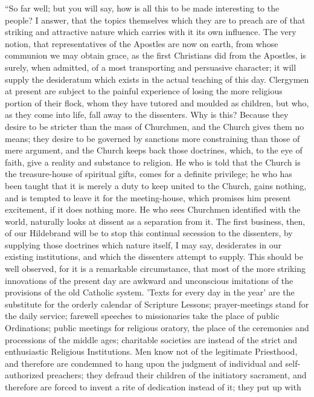 ``So far well; but you will say, how is all this
to be made interesting to the people? I answer, that the topics
themselves which they are to preach are of that striking and
attractive nature which carries with it its own influence. The very
notion, that representatives of the Apostles are now on earth, from
whose communion we may obtain grace, as the first Christians did from
the Apostles, is surely, when admitted, of a most transporting and
persuasive character; it will supply the desideratum which exists in
the actual teaching of this day. Clergymen at present are subject to
the painful experience of losing the more religious portion of their
flock, whom they have tutored and moulded as children, but who,
as they come into life, fall away to the dissenters. Why is this?
Because they desire to be stricter than the mass of Churchmen, and the
Church gives them no means; they desire to be governed by sanctions
more constraining than those of mere argument, and the Church keeps
back those doctrines, which, to the eye of faith, give a reality and
substance to religion. He who is told that the Church is the
treasure-house of spiritual gifts, comes for a definite privilege; he
who has been taught that it is merely a duty to keep united to the
Church, gains nothing, and is tempted to leave it for the
meeting-house, which promises him present excitement, if it does
nothing more. He who sees Churchmen identified with the world,
naturally looks at dissent as a separation from it. The first
business, then, of our Hildebrand will be to stop this continual
secession to the dissenters, by supplying those doctrines which nature
itself, I may say, desiderates in our existing institutions, and which
the dissenters attempt to supply. This should be well observed, for it
is a remarkable circumstance, that most of the more striking
innovations of the present day are awkward and unconscious imitations
of the provisions of the old Catholic system. 'Texts for every day in
the year' are the substitute for the orderly calendar of Scripture
Lessons; prayer-meetings stand for the daily service; farewell
speeches to missionaries take the place of public Ordinations; public
meetings for religious oratory, the place of the ceremonies and
processions of the middle ages; charitable societies are instead of
the strict and enthusiastic Religious Institutions. Men know not of
the legitimate Priesthood, and therefore are condemned to hang upon
the judgment of individual and self-authorized preachers; they defraud
their children of the initiatory sacrament, and therefore are
forced to invent a rite of dedication instead of it; they put up with
